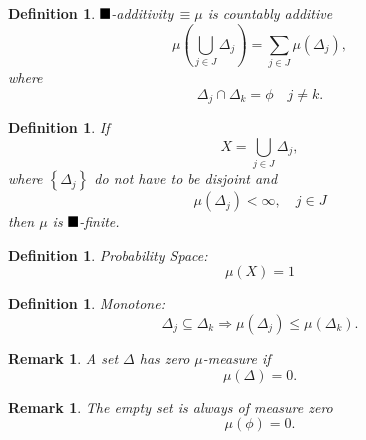 \documentclass[aps,preprint]{revtex4}%
\providecommand{\U}[1]{\protect\rule{.1in}{.1in}}
\newtheorem{definition}[theorem]{Definition}
\newtheorem{remark}[theorem]{Remark}
\begin{document}
\begin{definition}
$\U{3c3} $-additivity$\,\equiv\mu$ is countably additive
\begin{equation}
\mu\left(
{\textstyle\bigcup\limits_{j\in J}}
\Delta_{j}\right)  =\sum_{j\in J}\mu\left(  \Delta_{j}\right)  ,
\end{equation}
where
\begin{equation}
\Delta_{j}\cap\Delta_{k}=\phi\quad j\neq k.
\end{equation}

\end{definition}

\begin{definition}
If
\begin{equation}
X=%
{\textstyle\bigcup\limits_{j\in J}}
\Delta_{j},
\end{equation}
where $\left\{  \Delta_{j}\right\}  $ do not have to be disjoint and
\begin{equation}
\mu\left(  \Delta_{j}\right)  <\infty,\quad j\in J
\end{equation}
then $\mu$ is $\U{3c3} $-finite.
\end{definition}

\begin{definition}
Probability Space:%
\begin{equation}
\mu\left(  X\right)  =1
\end{equation}

\end{definition}

\begin{definition}
Monotone:
\begin{equation}
\Delta_{j}\subseteq\Delta_{k}\Rightarrow\mu\left(  \Delta_{j}\right)  \leq
\mu\left(  \Delta_{k}\right)  .
\end{equation}

\end{definition}

\begin{remark}
A set $\Delta$ has \emph{zero }$\mu$\emph{-measure if}
\begin{equation}
\mu\left(  \Delta\right)  =0.
\end{equation}

\end{remark}

\begin{remark}
The empty set is always of measure zero%
\begin{equation}
\mu\left(  \phi\right)  =0.
\end{equation}

\end{remark}
\end{document}
